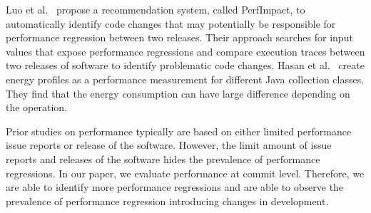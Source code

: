 Luo et al.~\cite{ACM2016:Luo} propose a recommendation system, called PerfImpact, to automatically identify code changes that may potentially be responsible for performance regression between two releases. Their approach searches for input values that expose performance regressions and compare execution traces between two releases of software to identify problematic code changes. Hasan et al.~\cite{Hasan:icse2016} create energy profiles as a performance measurement for different Java collection classes. They find that the energy consumption can have large difference depending on the operation.

Prior studies on performance typically are based on either limited performance issue reports or release of the software. However, the limit amount of issue reports and releases of the software hides the prevalence of performance regressions. In our paper, we evaluate performance at commit level. Therefore, we are able to identify more performance regressions and are able to observe the prevalence of performance regression introducing changes in development. 
